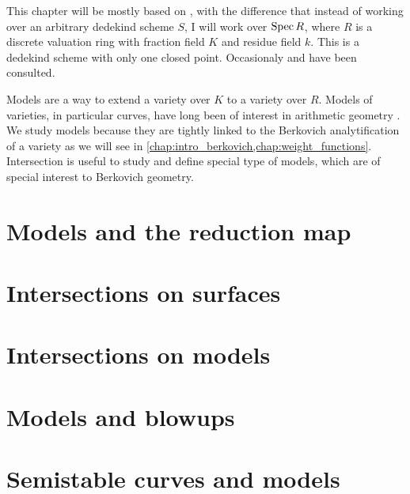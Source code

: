This chapter will be mostly based on \cite[chap.\ 8, 9, 10]{liuAlgebraicGeometryArithmetic2002}, with the difference that instead of working over an arbitrary dedekind scheme $S$, I will work over $\operatorname{Spec} R$, where $R$ is a discrete valuation ring with fraction field $K$ and residue field $k$. This is a dedekind scheme with only one closed point.  
Occasionaly \cite[appendix A]{hartshorneAlgebraicGeometry1977} and \cite[sec.\ III.7-8]{silvermanAdvancedTopicsArithmetic1994} have been consulted. 

Models are a way to extend a variety over $K$ to a variety over $R$. 
Models of varieties, in particular curves, have long been of interest in arithmetic geometry . 
We study models because they are tightly linked to the Berkovich analytification of a variety as we will see in \cref{chap:intro_berkovich,chap:weight_functions}. 
Intersection is useful to study and define special type of models, which are of special interest to Berkovich geometry.  

\section{Models and the reduction map} \label{sec:models}


\section{Intersections on surfaces} \label{sec:intersections_on_surfraces}


\section{Intersections on models} \label{sec:intersections_on_models}


\section{Models and blowups} \label{sec:models_and_blowups}


\section{Semistable curves and models} \label{sec:semistable_curves_and_models}




